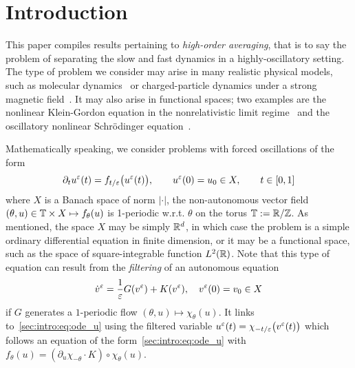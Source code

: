 

\section{Introduction}
\label{section:introduction}


This paper compiles results pertaining to \textit{high-order averaging},
that is to say the problem of separating the slow and fast dynamics in a
highly-oscillatory setting. The type of problem we consider may arise in
many realistic physical models, such as molecular
dynamics~\cite{garciaarchilla.1998.long} or charged-particle dynamics under a
strong magnetic field~\cite{chartier.2020.uniformly,
frenod.2009.long,frenod.2000.long}. It may also arise in functional
spaces; two examples are the nonlinear Klein-Gordon equation in the
nonrelativistic limit regime~\cite{bao.2014.uniformly,
bao.2019.comparison, chartier.2020.new} and the oscillatory nonlinear
Schrödinger equation~\cite{chartier.2015.uniformly,
castella.2015.stroboscopic}.


Mathematically speaking, we consider problems with forced oscillations of
the form 
\begin{equation} \label{sec:intro:eq:ode_u}
  \partial_t u^\varepsilon(t) = f_{t/\varepsilon}\big( u^\varepsilon(t) \big) , 
  \qquad 
  u^\varepsilon(0) = u_0 \in X, 
  \qquad
  t \in [0, 1] 
\end{equation}
where \( X \) is a Banach space of norm \( | \cdot | \), the
non-autonomous vector field \( (\theta,u) \in \mathbb{T} \times X \mapsto
f_\theta(u) \) is 1-periodic w.r.t. \( \theta \) on the torus \( \mathbb{T} :=
\mathbb{R}/\mathbb{Z} \). As mentioned, the space \(X\) may be simply \( \mathbb{R}^d \), in which
case the problem is a simple ordinary differential equation in finite
dimension, or it may be a functional space, such as the space of
square-integrable function \( L^2(\mathbb{R}) \). 
%
Note that this type of equation can result from the \textit{filtering} of
an autonomous equation
\begin{equation} \label{sec:intro:eq:ode_auto}
  \dot v^\varepsilon = \frac{1}{\varepsilon} G(v^\varepsilon) + K(v^\varepsilon), 
  \quad 
  v^\varepsilon(0)=v_0 \in X
\end{equation}
if $G$ generates a $1$-periodic flow $(\theta, u) \mapsto \chi_\theta(u)$.
It links to~\ref{sec:intro:eq:ode_u} using the filtered variable 
$u^\varepsilon(t) = \chi_{-t/\varepsilon}\big(v^\varepsilon(t) \big)$ which
follows an equation of the form~\eqref{sec:intro:eq:ode_u} with
$f_{\theta}(u) = \left(\partial_u \chi_{-\theta}\cdot K \right) \circ
\chi_{\theta}(u)$. 

